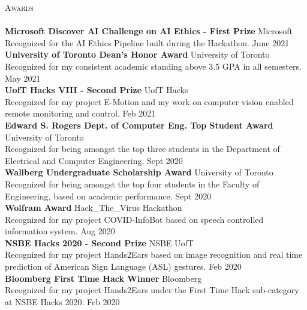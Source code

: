 \documentclass[a4paper]{article}
\newcommand{\lineunder} {
    \vspace*{-8pt} \\
    \hspace*{-18pt} \hrulefill \\
}
\newcommand{\header} [1] {
    {\hspace*{-18pt}\vspace*{6pt} \textsc{#1}}
    \vspace*{-6pt} \lineunder
}
\begin{document}
\header{Awards}
\textbf{Microsoft Discover AI Challenge on AI Ethics - First Prize} \hfill Microsoft\\
Recognized for the AI Ethics Pipeline built during the Hackathon. \hfill June 2021\\
\vspace*{2mm}
\textbf{University of Toronto Dean’s Honor Award} \hfill University of Toronto\\
Recognized for my consistent academic standing above 3.5 GPA in all semesters. \hfill May 2021\\
\vspace*{2mm}
\textbf{UofT Hacks VIII - Second Prize} \hfill UofT Hacks\\
Recognized for my project E-Motion and my work on computer vision enabled remote monitoring and control. \hfill Feb 2021\\
\vspace*{2mm}
\textbf{Edward S. Rogers Dept. of Computer Eng. Top Student Award} \hfill University of Toronto\\
Recognized for being amongst the top three students in the Department of Electrical and Computer Engineering. \hfill Sept 2020\\
\vspace*{2mm}
\textbf{Wallberg Undergraduate Scholarship Award} \hfill University of Toronto\\
Recognized for being amongst the top four students in the Faculty of Engineering, based on academic performance. \hfill Sept 2020\\
\vspace*{2mm}
\textbf{Wolfram Award} \hfill Hack\_The\_Virus Hackathon\\
Recognized for my project COVID-InfoBot based on speech controlled information system. \hfill Aug 2020\\
\vspace*{2mm}
\textbf{NSBE Hacks 2020 - Second Prize} \hfill NSBE UofT\\
Recognized for my project Hands2Ears based on image recognition and real time prediction of American Sign Language (ASL) gestures. \hfill Feb 2020\\
\vspace*{2mm}
\textbf{Bloomberg First Time Hack Winner} \hfill Bloomberg\\
Recognized for my project Hands2Ears under the \textquotedbl{}First Time Hack\textquotedbl{} sub-category at NSBE Hacks 2020. \hfill Feb 2020\\
\vspace*{2mm}
\end{document}

